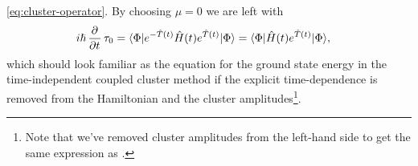             \autoref{eq:cluster-operator}.
            By choosing $\mu = 0$ we are left with
            \begin{align}
                i\hslash \dpd[]{}{t}\clustamp_{0}
                &=
                \bra{\slat} e^{-\clust(t)} \hamil(t) e^{\clust(t)}
                \ketslat
                =
                \bra{\slat} \hamil(t) e^{\clust(t)}
                \ketslat,
            \end{align}
            which should look familiar as the equation for the ground state
            energy in the time-independent coupled cluster method if the
            explicit time-dependence is removed from the Hamiltonian and the
            cluster amplitudes\footnote{%
                Note that we've removed cluster amplitudes from the left-hand
                side to get the same expression as
                \citeauthor{pedersen2018symplectic}.
            }.

